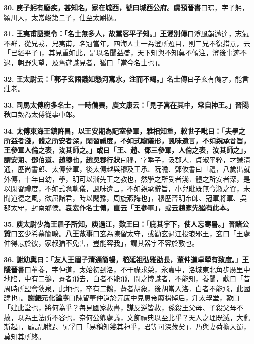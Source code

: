 \textbf{30.} \textbf{庾子躬有廢疾，甚知名，家在城西，號曰城西公府。}{\footnotesize \textbf{虞預晉書}曰琮，字子躬，潁川人，太常峻第二子，仕至太尉掾。}

\textbf{31.} \textbf{王夷甫語樂令：「名士無多人，故當容平子知。」}{\footnotesize \textbf{王澄別傳}曰澄風韻邁達，志氣不群，從兄戎，兄夷甫，名冠當年，四海人士一為澄所題目，則二兄不復措意，云「已經平子」，其見重如此，是以名聞益盛，天下知與不知莫不傾注，澄後事迹不逮，朝野失望，及舊遊識見者，猶曰「當今名士也」。}

\textbf{32.} \textbf{王太尉云：「郭子玄語議如懸河寫水，注而不竭。」}{\footnotesize \textbf{名士傳}曰子玄有儁才，能言莊老。}

\textbf{33.} \textbf{司馬太傅府多名士，一時儁異，庾文康云：「見子嵩在其中，常自神王。」}{\footnotesize \textbf{晉陽秋}曰敳為太傅從事中郎。}

\textbf{34.} \textbf{太傅東海王鎮許昌，以王安期為記室參軍，雅相知重，敕世子毗曰：「夫學之所益者淺，體之所安者深，閑習禮度，不如式瞻儀形，諷味遺言，不如親承音旨，王參軍人倫之表，汝其師之。」或曰「王、趙、鄧三參軍，人倫之表，汝其師之」，謂安期、鄧伯道、趙穆也，}{\footnotesize \textbf{趙吳郡行狀}曰穆，字季子，汲郡人，貞淑平粹，才識清通，歷尚書郎、太傅參軍，後太傅越與穆及王承、阮瞻、鄧攸書曰「禮，八歲出就外傅，十年曰幼，學，明可以漸先王之教也，然學之所受者淺，體之所安者深，是以閑習禮度，不如式瞻軌儀，諷味遺言，不如親承辭旨，小兒毗既無令淑之資，未聞道德之風，欲屈諸君，時以閑豫，周旋燕誨也」，穆歷晉明帝師、冠軍將軍、吳郡太守，封南鄉侯。}\textbf{袁宏作名士傳，直云「王參軍」，或云趙家先猶有此本。}

\textbf{35.} \textbf{庾太尉少為王眉子所知，庾過江，歎王曰：「庇其宇下，使人忘寒暑。」}{\footnotesize \textbf{晉諸公贊}曰玄少希慕簡曠。\textbf{八王故事}曰玄為陳留太守，或勸玄過江投琅邪王，玄曰「王處仲得志於彼，家叔猶不免害，豈能容我」，謂其器宇不容於敦也。}

\textbf{36.} \textbf{謝幼輿曰：「友人王眉子清通簡暢，嵇延祖弘雅劭長，董仲道卓犖有致度。」}{\footnotesize \textbf{王隱晉書}曰董養，字仲道，太始初到洛，不干祿求榮，永嘉中，洛城東北角步廣里中地陷，中有二鵝，蒼者飛去，白者不能飛，問之博識者，不能知，養聞，歎曰「昔周時所盟會狄泉，此地也，卒有二鵝，蒼者胡象，後胡當入洛，白者不能飛，此國諱也」。\textbf{謝鯤元化論序}曰陳留董仲道於元康中見惠帝廢楊悼后，升太學堂，歎曰「建此堂也，將何為乎？每見國家赦書，謀反逆皆赦，孫殺王父母、子殺父母不赦，以為王法所不容也，奈何公卿處議，文飾禮典以至此乎？天人之理既滅，大亂斯起」，顧謂謝鯤、阮孚曰「易稱知幾其神乎，君等可深藏矣」，乃與妻荷擔入蜀，莫知其所終。}

